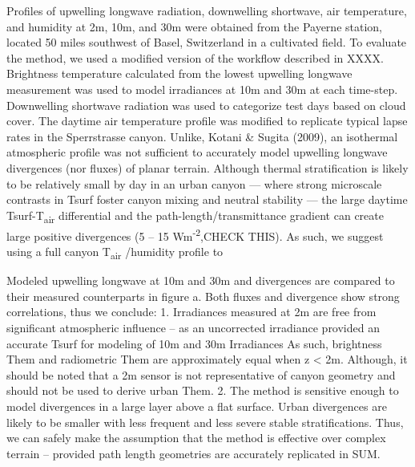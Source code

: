Profiles of upwelling longwave radiation, downwelling shortwave, air temperature, and humidity at 2m, 10m, and 30m were obtained from the Payerne station, located 50 miles southwest of Basel, Switzerland in a cultivated field. To evaluate the method, we used a modified version of the workflow described in XXXX. Brightness temperature calculated from the lowest upwelling longwave measurement was used to model irradiances at 10m and 30m at each time-step. Downwelling shortwave radiation was used to categorize test days based on cloud cover. The daytime air temperature profile was modified to replicate typical lapse rates in the Sperrstrasse canyon. Unlike, Kotani \& Sugita (2009), an isothermal atmospheric profile was not sufficient to accurately model upwelling longwave divergences (nor fluxes) of planar terrain. Although thermal stratification is likely to be relatively small by day in an urban canyon \cite{Nakamura1988} --- where strong microscale contrasts in Tsurf foster canyon mixing and neutral stability --- the large daytime Tsurf-T\textsubscript{air}  differential and the path-length/transmittance gradient can create large positive divergences (5 – 15 Wm\textsuperscript{-2},CHECK THIS). As such, we suggest using a full canyon T\textsubscript{air} /humidity profile to 

Modeled upwelling longwave at 10m and 30m and divergences are compared to their measured counterparts in figure a. Both fluxes and divergence show strong correlations, thus we conclude: 1. Irradiances measured at 2m are free from significant atmospheric influence – as an uncorrected irradiance provided an accurate Tsurf for modeling of 10m and 30m Irradiances As such, brightness Them and radiometric Them are approximately equal when z < 2m. Although, it should be noted that a 2m sensor is not representative of canyon geometry and should not be used to derive urban Them. 2. The method is sensitive enough to model divergences in a large layer above a flat surface. Urban divergences are likely to be smaller with less frequent and less severe stable stratifications. Thus, we can safely make the assumption that the method is effective over complex terrain – provided path length geometries are accurately replicated in SUM.


